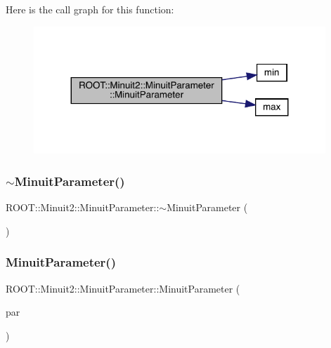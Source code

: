 Here is the call graph for this function\+:
\nopagebreak
\begin{figure}[H]
\begin{center}
\leavevmode
\includegraphics[width=311pt]{dd/dfb/classROOT_1_1Minuit2_1_1MinuitParameter_a13b433906347405bf85ef2bdf5803990_cgraph}
\end{center}
\end{figure}
\mbox{\label{classROOT_1_1Minuit2_1_1MinuitParameter_a487d895f06a46c8c2e1e3dbc97dd0a26}} 
\subsubsection{\texorpdfstring{$\sim$MinuitParameter()}{~MinuitParameter()}\hspace{0.1cm}{\footnotesize\ttfamily [2/3]}}
{\footnotesize\ttfamily R\+O\+O\+T\+::\+Minuit2\+::\+Minuit\+Parameter\+::$\sim$\+Minuit\+Parameter (\begin{DoxyParamCaption}{ }\end{DoxyParamCaption})\hspace{0.3cm}{\ttfamily [inline]}}

\mbox{\label{classROOT_1_1Minuit2_1_1MinuitParameter_a0ac95809b18c619597764fcfabcb70fe}} 
\subsubsection{\texorpdfstring{MinuitParameter()}{MinuitParameter()}\hspace{0.1cm}{\footnotesize\ttfamily [8/12]}}
{\footnotesize\ttfamily R\+O\+O\+T\+::\+Minuit2\+::\+Minuit\+Parameter\+::\+Minuit\+Parameter (\begin{DoxyParamCaption}\item[{const \mbox{\hyperlink{classROOT_1_1Minuit2_1_1MinuitParameter}{Minuit\+Parameter}} \&}]{par }\end{DoxyParamCaption})\hspace{0.3cm}{\ttfamily [inline]}}

